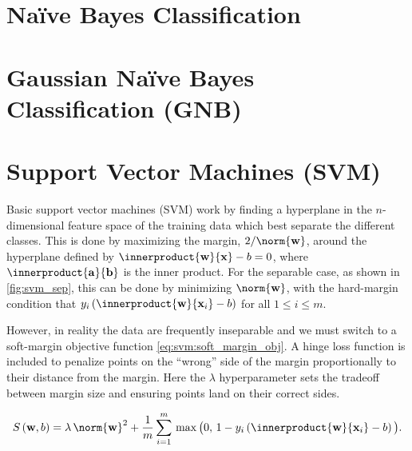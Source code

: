 
\section{N{a\"i}ve Bayes Classification}
\label{class:Bayes}

\section{Gaussian N{a\"i}ve Bayes Classification (GNB)}
\label{class:Bayes:GNB}

\section{Support Vector Machines (SVM)}
\label{class:SVM}

Basic support vector machines (SVM) work by finding a hyperplane in the $n$-dimensional
feature space of the training data which best separate the different classes.
This is done by maximizing the margin, $2/\norm{\mathbf{w}}$,
around the hyperplane defined by $\innerproduct{\mathbf{w}}{\mathbf{x}} - b = 0$,
where $\innerproduct{\mathbf{a}}{\mathbf{b}}$ is the inner product.
For the separable case, as shown in \cref{fig:svm_sep}, this
can be done by minimizing $\norm{\mathbf{w}}$, with the hard-margin condition that
$y_{i} \left(\innerproduct{\mathbf{w}}{\mathbf{x}_{i}} - b\right)$ for all $1 \leq i \leq m$.

However, in reality the data are frequently inseparable and we must switch
to a soft-margin objective function \cref{eq:svm:soft_margin_obj}.
A hinge loss function is included to penalize points on the ``wrong'' side of the margin
proportionally to their distance from the margin.
Here the $\lambda$ hyperparameter sets the tradeoff between
margin size and ensuring points land on their correct sides.

\begin{equation} \label{eq:svm:soft_margin_obj}
S\left(\mathbf{w}, b\right) =
\lambda\, \norm{\mathbf{w}}^{2}
+ \frac{1}{m} \sum_{i=1}^{m} \,
\max{\big(0,\, 1 - y_{i} \left(\innerproduct{\mathbf{w}}{\mathbf{x}_{i}} - b\right)\big)}.
\end{equation}

